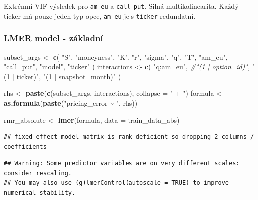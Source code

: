 \documentclass[
]{article}
\newenvironment{Shaded}{\begin{snugshade}}{\end{snugshade}}
\newcommand{\AttributeTok}[1]{\textcolor[rgb]{0.13,0.29,0.53}{#1}}
\newcommand{\CommentTok}[1]{\textcolor[rgb]{0.56,0.35,0.01}{\textit{#1}}}
\newcommand{\FunctionTok}[1]{\textcolor[rgb]{0.13,0.29,0.53}{\textbf{#1}}}
\newcommand{\NormalTok}[1]{#1}
\newcommand{\OtherTok}[1]{\textcolor[rgb]{0.56,0.35,0.01}{#1}}
\newcommand{\StringTok}[1]{\textcolor[rgb]{0.31,0.60,0.02}{#1}}
\begin{document}
Extrémní VIF výsledek pro \texttt{am\_eu} a \texttt{call\_put}. Silná
multikolinearita. Každý ticker má pouze jeden typ opce, \texttt{am\_eu}
je s \texttt{ticker} redundatní.

\subsubsection{LMER model - základní}\label{lmer-model---zuxe1kladnuxed}

\begin{Shaded}
\begin{Highlighting}[]
\NormalTok{subset\_args }\OtherTok{\textless{}{-}} \FunctionTok{c}\NormalTok{(}
  \StringTok{"S"}\NormalTok{,}
  \StringTok{"moneyness"}\NormalTok{,}
  \StringTok{"K"}\NormalTok{,}
  \StringTok{"r"}\NormalTok{,}
  \StringTok{"sigma"}\NormalTok{,}
  \StringTok{"q"}\NormalTok{,}
  \StringTok{"T"}\NormalTok{,}
  \StringTok{"am\_eu"}\NormalTok{,}
  \StringTok{"call\_put"}\NormalTok{,}
  \StringTok{"model"}\NormalTok{,}
  \StringTok{"ticker"}
\NormalTok{)}
\NormalTok{interactions }\OtherTok{\textless{}{-}} \FunctionTok{c}\NormalTok{(}
  \StringTok{"q:am\_eu"}\NormalTok{,}
  \CommentTok{\#"(1 | option\_id)",}
  \StringTok{"(1 | ticker)"}\NormalTok{,}
  \StringTok{"(1 | snapshot\_month)"}
\NormalTok{)}

\NormalTok{rhs }\OtherTok{\textless{}{-}} \FunctionTok{paste}\NormalTok{(}\FunctionTok{c}\NormalTok{(subset\_args, interactions), }\AttributeTok{collapse =} \StringTok{" + "}\NormalTok{)}
\NormalTok{formula }\OtherTok{\textless{}{-}} \FunctionTok{as.formula}\NormalTok{(}\FunctionTok{paste}\NormalTok{(}\StringTok{"pricing\_error \textasciitilde{} "}\NormalTok{, rhs))}

\NormalTok{rmr\_absolute }\OtherTok{\textless{}{-}} \FunctionTok{lmer}\NormalTok{(formula, }\AttributeTok{data =}\NormalTok{ train\_data\_abs)}
\end{Highlighting}
\end{Shaded}

\begin{verbatim}
## fixed-effect model matrix is rank deficient so dropping 2 columns / coefficients
\end{verbatim}

\begin{verbatim}
## Warning: Some predictor variables are on very different scales: consider rescaling. 
## You may also use (g)lmerControl(autoscale = TRUE) to improve numerical stability.
\end{verbatim}
\end{document}
